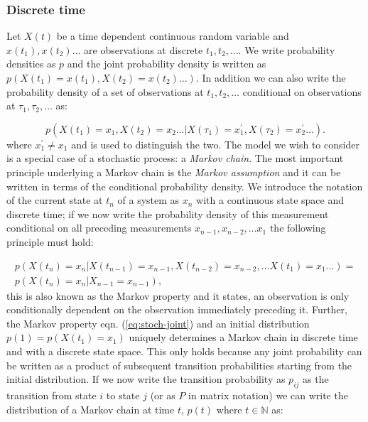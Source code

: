\subsubsection{Discrete time}

Let $X(t)$ be a time dependent continuous random variable and $x(t_1), x(t_2) \ldots $ are observations at discrete $t_1, t_2, \ldots$. We write probability densities as $p$ and the joint probability density is written as $p(X(t_1) = x(t_1), X(t_2) = x(t_2) \ldots)$. In addition we can also write the probability density of a set of observations at $t_1, t_2, \ldots$ conditional on observations at $\tau_1, \tau_2, \ldots $ as:

\begin{equation}
  \label{eq:stoch-joint-init}
  p(X(t_1) = x_1, X(t_2) = x_2\ldots | X(\tau_1 ) = x^{\prime}_1, X(\tau_2) = x^{\prime}_2 \ldots).
\end{equation}
where $x^{\prime}_1 \neq x_1$ and is used to distinguish the two. The model we wish to consider is a special case of a stochastic process: a \emph{Markov chain}. The most important principle underlying a Markov chain is the \emph{Markov assumption} and it can be written in terms of the conditional probability density. We introduce the notation of the current state at $t_n$ of a system as $x_n$ with a continuous state space and discrete time; if we now write the probability density of this measurement conditional on all preceding measurements $x_{n-1}, x_{n-2}, \ldots x_1$ the following principle must hold:

\begin{multline}
  \label{eq:stoch-joint}
  p(X(t_n)=x_n | X(t_{n-1}) = x_{n-1}, X(t_{n-2}) =x_{n-2}, \ldots X(t_1)=x_1 \ldots) = \\ p(X(t_n)=x_{n}| X_{n-1} = x_{n-1}),
\end{multline}
this is also known as the Markov property and it states, an observation is only conditionally dependent on the observation immediately preceding it. Further, the Markov property eqn. (\ref{eq:stoch-joint}) and an initial distribution $ p(1) = p(X(t_1) = x_1)$ uniquely determines a Markov chain in discrete time and with a discrete state space. This only holds because any joint probability can be written as a product of subsequent transition probabilities starting from the initial distribution. If we now write the transition probability as $p_{ij}$ as the transition from state $i$ to state $j$ (or as $P$ in matrix notation) we can write the distribution of a Markov chain at time $t$, $p(t)$ where $t \in \mathbb{N}$ as:


